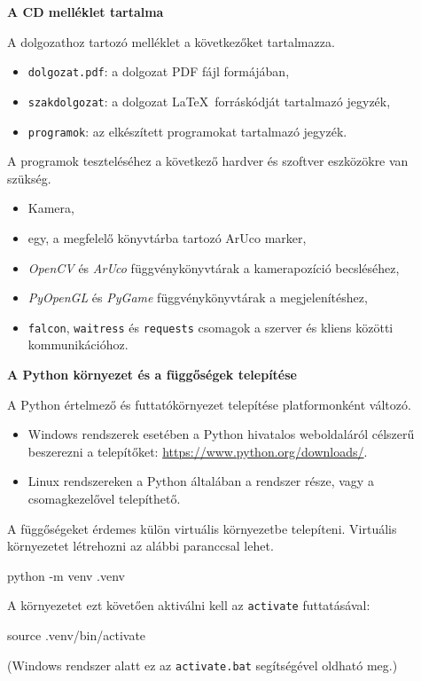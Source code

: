 \pagestyle{empty}

\noindent \textbf{\Large A CD melléklet tartalma}

\vskip 1cm

\noindent A dolgozathoz tartozó melléklet a következőket tartalmazza.

\begin{itemize}
\item \texttt{dolgozat.pdf}: a dolgozat PDF fájl formájában,
\item \texttt{szakdolgozat}: a dolgozat \LaTeX\ forráskódját tartalmazó jegyzék,
\item \texttt{programok}: az elkészített programokat tartalmazó jegyzék.
\end{itemize}

\bigskip

\noindent A programok teszteléséhez a következő hardver és szoftver eszközökre van szükség.
\begin{itemize}
	\item Kamera,
	\item egy, a megfelelő könyvtárba tartozó ArUco marker,
	\item \textit{OpenCV} és \textit{ArUco} függvénykönyvtárak a kamerapozíció becsléséhez,
	\item \textit{PyOpenGL} és \textit{PyGame} függvénykönyvtárak a megjelenítéshez,
	\item \texttt{falcon}, \texttt{waitress} és \texttt{requests} csomagok a szerver és kliens közötti kommunikációhoz.
\end{itemize}

\bigskip

\noindent \textbf{A Python környezet és a függőségek telepítése}

\medskip

A Python értelmező és futtatókörnyezet telepítése platformonként változó.
\begin{itemize}
	\item Windows rendszerek esetében a Python hivatalos weboldaláról célszerű beszerezni a telepítőket: \url{https://www.python.org/downloads/}.
	\item Linux rendszereken a Python általában a rendszer része, vagy a csomagkezelővel telepíthető.
\end{itemize}

\medskip

A függőségeket érdemes külön virtuális környezetbe telepíteni.
Virtuális környezetet létrehozni az alábbi paranccsal lehet.
\begin{python}
python -m venv .venv
\end{python}
A környezetet ezt követően aktiválni kell az \texttt{activate} futtatásával:
\begin{python}
source .venv/bin/activate
\end{python}
(Windows rendszer alatt ez az \texttt{activate.bat} segítségével oldható meg.)

